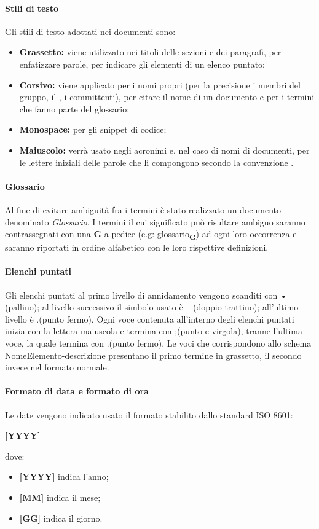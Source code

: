 \paragraph{Stili di testo}
Gli stili di testo adottati nei documenti sono: 
\begin{itemize}
	\item \textbf{Grassetto:} viene utilizzato nei titoli delle sezioni e dei paragrafi, per enfatizzare parole, per indicare gli elementi di un elenco puntato;
	\item \textbf{Corsivo:} viene applicato per i nomi propri (per la precisione i membri del gruppo, il , i committenti), per citare il nome di un documento e per i termini che fanno parte del glossario;
	\item \textbf{Monospace:} per gli snippet di codice;
	\item \textbf{Maiuscolo:} verrà usato negli acronimi e, nel caso di nomi di documenti, per le lettere iniziali delle parole che li compongono secondo la convenzione \textit{}.
\end{itemize}
\paragraph{Glossario}  
Al fine di evitare ambiguità fra i termini è stato realizzato un documento denominato \textit{Glossario}. I termini il cui significato può risultare ambiguo saranno contrassegnati con una \textbf{G} a pedice (e.g: \texorpdfstring{glossario\textsubscript{\textbf{G}}})) ad ogni loro occorrenza e saranno riportati in ordine alfabetico con le loro rispettive definizioni.
\paragraph{Elenchi puntati}
Gli elenchi puntati al primo livello di annidamento vengono scanditi con • (pallino); al livello successivo il simbolo usato è -- (doppio trattino); all'ultimo livello è .(punto fermo).\newline
Ogni voce contenuta all'interno degli elenchi puntati inizia con la lettera maiuscola e termina con ;(punto e virgola), tranne l'ultima voce, la quale termina con .(punto fermo).\newline
Le voci che corrispondono allo schema NomeElemento-descrizione presentano il primo termine in grassetto, il secondo invece nel formato normale. 
\paragraph{Formato di data e formato di ora}
Le date vengono indicato usato il formato stabilito dallo standard ISO 8601:\newline
\centerline{\textbf{[YYYY]\-[MM]\-[DD]}}
\newline
dove:
\begin{itemize}
	\item \textbf{[YYYY]} indica l'anno;
	\item \textbf{[MM]} indica il mese;
	\item \textbf{[GG]} indica il giorno.
\end{itemize}
